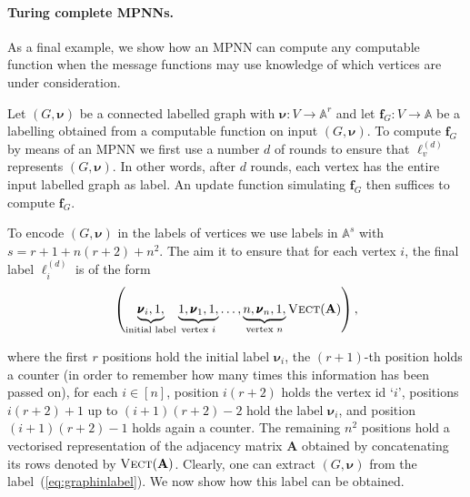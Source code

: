\paragraph{Turing complete MPNNs.}
 As a final example, we show how an MPNN can compute any computable function when the message functions may use knowledge of which vertices are under consideration. 
\begin{example}
	Let $( G,\pmb{\nu})$ be a connected labelled graph with $\pmb{\nu}:V\to\mathbb{A}^r$ and let $\mathbf{f}_G:V\to\mathbb{A}$ be a labelling 
	obtained from a computable function on input 	$( G,\pmb{\nu})$. To compute $\mathbf{f}_G$ by means of an MPNN we first use a number $d$ of rounds to ensure that $\pmb{\ell}^{(d)}_v$ represents $( G,\pmb{\nu})$. In other words, after $d$ rounds, each vertex has the entire input labelled graph as label. An update function simulating $\mathbf{f}_G$ then suffices to compute $\mathbf{f}_G$.
	
To encode $( G,\pmb{\nu})$ in the labels of vertices we use labels in $\mathbb{A}^s$ with 
$s=r+1+n(r+2)+n^2$. The aim it to ensure that for each vertex $i$, the final label $\pmb{\ell}_i^{(d)}$ is of the form
\begin{equation}
\left(\underbrace{\pmb{\nu}_i,1,}_{\text{initial label}}\underbrace{1,\pmb{\nu}_1,1,}_{\text{vertex $i$}}\ldots,\underbrace{n,\pmb{\nu}_n,1,}_{\text{vertex $n$}}\textsc{Vect}(\mathbf{A})\right), \label{eq:graphinlabel}
\end{equation}

where the first $r$ positions hold the initial label $\pmb{\nu}_i$,
the $(r+1)$-th position holds a counter (in order to remember how many times
this information has been passed on), for each $i\in[n]$, position
$i(r+2)$ holds the vertex id `$i$', positions $i(r+2)+1$ up to $(i+1)(r+2)-2$
hold the label $\pmb{\nu}_i$, and position $(i+1)(r+2)-1$ holds again a counter.
The remaining $n^2$ positions hold a vectorised representation of the adjacency matrix $\mathbf{A}$ obtained by concatenating its rows denoted by $\textsc{Vect}(\mathbf{A})$. Clearly, one can extract 
$(G,\pmb{\nu})$ from the label~(\ref{eq:graphinlabel}). We now show how this label can be obtained.


\end{example}
